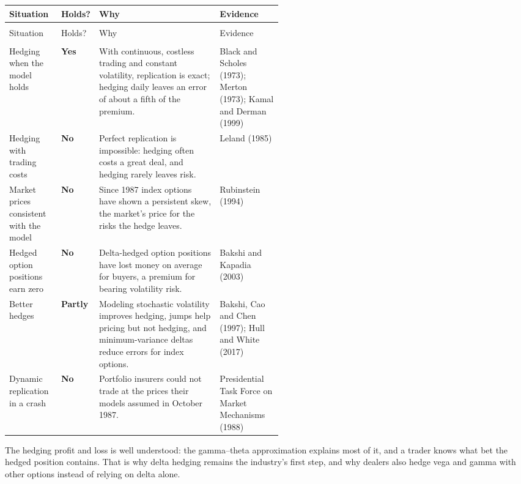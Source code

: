 {\small
\begin{longtable}{@{}>{\raggedright\arraybackslash}p{0.19\linewidth}>{\raggedright\arraybackslash}p{0.10\linewidth}>{\raggedright\arraybackslash}p{}>{\raggedright\arraybackslash}p{0.23\linewidth}@{}}
\toprule
Situation & Holds? & Why & Evidence \\
\midrule
\endfirsthead
\multicolumn{4}{@{}l}{\emph{(continued)}} \\
\toprule
Situation & Holds? & Why & Evidence \\
\midrule
\endhead
\midrule
\multicolumn{4}{r@{}}{\emph{(continued on the next page)}} \\
\endfoot
\bottomrule
\endlastfoot
Hedging when the model holds & \textbf{Yes} & With continuous, costless trading and constant volatility, replication is exact; hedging daily leaves an error of about a fifth of the premium. & Black and Scholes (1973); Merton (1973); Kamal and Derman (1999) \\
\addlinespace[3pt]
Hedging with trading costs & \textbf{No} & Perfect replication is impossible: hedging often costs a great deal, and hedging rarely leaves risk. & Leland (1985) \\
\addlinespace[3pt]
Market prices consistent with the model & \textbf{No} & Since 1987 index options have shown a persistent skew, the market's price for the risks the hedge leaves. & Rubinstein (1994) \\
\addlinespace[3pt]
Hedged option positions earn zero & \textbf{No} & Delta-hedged option positions have lost money on average for buyers, a premium for bearing volatility risk. & Bakshi and Kapadia (2003) \\
\addlinespace[3pt]
Better hedges & \textbf{Partly} & Modeling stochastic volatility improves hedging, jumps help pricing but not hedging, and minimum-variance deltas reduce errors for index options. & Bakshi, Cao and Chen (1997); Hull and White (2017) \\
\addlinespace[3pt]
Dynamic replication in a crash & \textbf{No} & Portfolio insurers could not trade at the prices their models assumed in October 1987. & Presidential Task Force on Market Mechanisms (1988) \\
\end{longtable}
}

The hedging profit and loss is well understood: the gamma--theta approximation explains most of it, and a trader knows what bet the hedged position contains. That is why delta hedging remains the industry's first step, and why dealers also hedge vega and gamma with other options instead of relying on delta alone.

